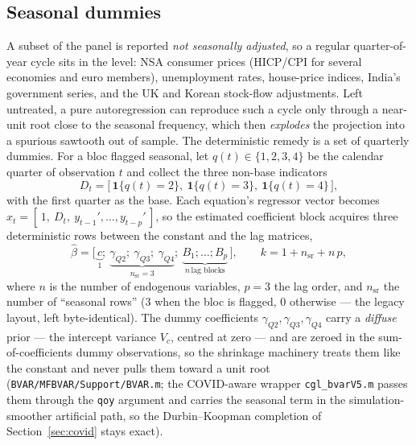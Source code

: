 \documentclass[11pt]{article}
\theoremstyle{plain}
\theoremstyle{remark}
\begin{document}
\subsection{Seasonal dummies}\label{sec:seasonal}

A subset of the panel is reported \emph{not seasonally adjusted}, so a
regular quarter-of-year cycle sits in the level: NSA consumer prices
(HICP/CPI for several economies and euro members), unemployment rates,
house-price indices, India's government series, and the UK and Korean
stock-flow adjustments. Left untreated, a pure autoregression can
reproduce such a cycle only through a near-unit root close to the
seasonal frequency, which then \emph{explodes} the projection into a
spurious sawtooth out of sample. The deterministic remedy is a set of
quarterly dummies. For a bloc flagged seasonal, let
$q(t)\in\{1,2,3,4\}$ be the calendar quarter of observation $t$ and
collect the three non-base indicators
\begin{equation}\label{eq:seasdummy}
  D_t = \bigl[\,\mathbf{1}\{q(t)=2\},\ \mathbf{1}\{q(t)=3\},\
              \mathbf{1}\{q(t)=4\}\,\bigr],
\end{equation}
with the first quarter as the base. Each equation's regressor vector
becomes $x_t = [\,1,\ D_t,\ y_{t-1}',\dots,y_{t-p}'\,]$, so the
estimated coefficient block acquires three deterministic rows between
the constant and the lag matrices,
\begin{equation}\label{eq:betalayout}
  \widehat{\beta}
   = \bigl[\,\underbrace{c}_{1};\
             \underbrace{\gamma_{Q2};\ \gamma_{Q3};\ \gamma_{Q4}}_{n_{\mathrm{sr}}=3};\
             \underbrace{B_1;\dots;B_p}_{n\,\text{lag blocks}}\,\bigr],
  \qquad k = 1 + n_{\mathrm{sr}} + n\,p,
\end{equation}
where $n$ is the number of endogenous variables, $p=3$ the lag order,
and $n_{\mathrm{sr}}$ the number of ``seasonal rows'' ($3$ when the bloc
is flagged, $0$ otherwise --- the legacy layout, left byte-identical).
The dummy coefficients $\gamma_{Q2},\gamma_{Q3},\gamma_{Q4}$ carry a
\emph{diffuse} prior --- the intercept variance $V_c$, centred at zero
--- and are zeroed in the sum-of-coefficients dummy observations, so the
shrinkage machinery treats them like the constant and never pulls them
toward a unit root (\texttt{BVAR/MFBVAR/Support/BVAR.m}; the COVID-aware
wrapper \texttt{cgl\_bvarV5.m} passes them through the \texttt{qoy}
argument and carries the seasonal term in the simulation-smoother
artificial path, so the Durbin--Koopman completion of
Section~\ref{sec:covid} stays exact).
\end{document}
